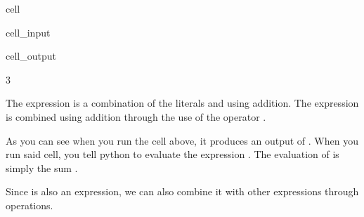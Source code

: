 \documentclass[letterpaper,10pt,english]{jupyterBook}
\begin{document}
\begin{sphinxuseclass}{cell}\begin{sphinxVerbatimInput}

\begin{sphinxuseclass}{cell_input}
\begin{sphinxVerbatim}[commandchars=\\\{\}]
  
\end{sphinxVerbatim}

\end{sphinxuseclass}\end{sphinxVerbatimInput}
\begin{sphinxVerbatimOutput}

\begin{sphinxuseclass}{cell_output}
\begin{sphinxVerbatim}[commandchars=\\\{\}]
3
\end{sphinxVerbatim}

\end{sphinxuseclass}\end{sphinxVerbatimOutput}

\end{sphinxuseclass}
\sphinxAtStartPar
The expression  is a combination of the literals  and  using addition. The expression is combined using addition through the use of the operator \sphinxcode{\sphinxupquote{+}}.

\sphinxAtStartPar
As you can see when you run the cell above, it produces an output of . When you run said cell, you tell python to evaluate the expression . The evaluation of  is simply the sum .

\sphinxAtStartPar
Since  is also an expression, we can also combine it with other expressions through operations.
\end{document}
